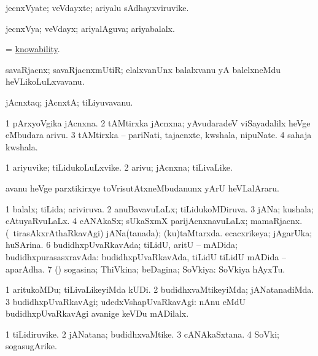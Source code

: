 \bentry
{}
\gl{\nA}
\bmng
jecnxVyate; veVdayxte; ariyalu sAdhayxviruvike. 
\emng
\eentry

\bentry
{}
\gl{\gu}
\bmng
jecnxVya; veVdayx; ariyalAguva; ariyabalalx. 
\emng
\eentry

\bentry
{}
\gl{\nA}
\bmng
 = \hyperlink{knowability}{knowability}. 
\emng
\eentry

\bentry
{}
\gl{\nA}
\bmng
savaRjacnx; savaRjacnxmUtiR; elalxvanUnx balalxvanu yA balelxneMdu heVLikoLuLxvavanu. 
\emng
\eentry

\bentry
{}
\gl{\nA}
\bmng
jAcnxtaq; jAcnxtA; tiLiyuvavanu. 
\emng
\eentry

\bentry
{}
\gl{\nA}
\bmng
\bnum
\num{1} pArxyoVgika jAcnxna. 
\num{2} tAMtirxka jAcnxna; yAvudaradeV viSayadalilx heVge eMbudara arivu. 
\num{3} tAMtirxka -- pariNati, tajacnxte, kwshala, nipuNate. 
\num{4} sahaja kwshala. 
\enum
\emng
\eentry

\bentry
{}
\gl{\nA}
\bmng
\bnum
\num{1} ariyuvike; tiLidukoLuLxvike. 
\num{2} arivu; jAcnxna; tiLivaLike. 
\enum
\emng

\noindent\gl{\nuga}
\bmng
{} avanu heVge parxtikirxye toVrisutAtxneMbudanunx yArU heVLalAraru. 
\emng
\eentry

\bentry
{}
\gl{\gu}
\bmng
\bnum
\num{1} balalx; tiLida; ariviruva. 
\num{2} anuBavavuLaLx; tiLidukoMDiruva. 
\num{3} jANa; kushala; cAtuyaRvuLaLx. 
\num{4} cANAkaSx; sUkaSxmX parijAcnxnavuLaLx; mamaRjacnx. 
 (\sA\ tirasAkxrAthaRkavAgi) 
\banum
{} jANa(tanada); (ku)taMtarxda. 
 ecacxrikeya; jAgarUka; huSArina. 
\eanum
\numie
\num{6} budidhxpUvaRkavAda; tiLidU, aritU -- mADida; budidhxpurasasxravAda:  budidhxpUvaRkavAda, tiLidU tiLidU mADida -- aparAdha. 
\num{7} (\AmA) sogasina; ThiVkina; beDagina; SoVkiya:  SoVkiya hAyxTu. 
\enum
\emng
\eentry

\bentry
{}
\gl{\kirxvi}
\bmng
\bnum
\num{1} aritukoMDu; tiLivaLikeyiMda kUDi. 
\num{2} budidhxvaMtikeyiMda; jANatanadiMda. 
\num{3} budidhxpUvaRkavAgi; udedxVshapUvaRkavAgi:  nAnu eMdU budidhxpUvaRkavAgi avanige keVDu mADilalx. 
\enum
\emng
\eentry

\bentry
{}
\gl{\nA}
\bmng
\bnum
\num{1} tiLidiruvike. 
\num{2} jANatana; budidhxvaMtike. 
\num{3} cANAkaSxtana. 
\num{4} SoVki; sogasugArike. 
\enum
\emng
\eentry

